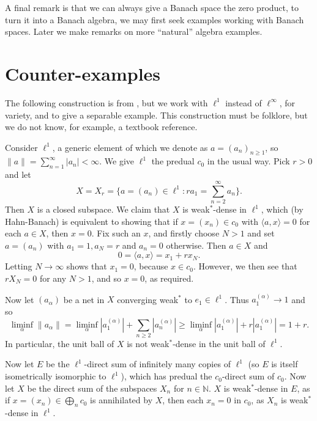 \documentclass[a4paper,12pt]{article}
\theoremstyle{plain}
\theoremstyle{definition}
\newcommand{\ip}[2]{\langle{#1},{#2}\rangle}
\begin{document}
A final remark is that we can always give a Banach space the zero product, to turn it into a Banach
algebra, we may first seek examples working with Banach spaces.  Later we make remarks on more
``natural'' algebra examples.


\section{Counter-examples}

The following construction is from \cite{oz}, but we work with $\ell^1$ instead of $\ell^\infty$,
for variety, and to give a separable example.  This construction must be folklore, but we do not
know, for example, a textbook reference.

Consider $\ell^1$, a generic element of which we denote as $a = (a_n)_{n\geq 1}$, so $\|a\| =
\sum_{n=1}^\infty |a_n| < \infty$.  We give $\ell^1$ the predual $c_0$ in the usual way.  Pick
$r>0$ and let
\[ X = X_r = \big\{ a=(a_n)\in\ell^1 : r a_1 = \sum_{n=2}^\infty a_n \big\}. \]
Then $X$ is a closed subspace.
We claim that $X$ is weak$^*$-dense in $\ell^1$, which (by Hahn-Banach) is equivalent to showing
that if $x=(x_n)\in c_0$ with $\ip{a}{x}=0$ for each $a\in X$, then $x=0$.  Fix such an $x$, and
firstly choose $N>1$ and set $a=(a_n)$ with $a_1=1, a_N=r$ and $a_n=0$ otherwise.  Then $a\in X$
and
\[ 0 = \ip{a}{x} = x_1 + rx_N. \]
Letting $N\rightarrow\infty$ shows that $x_1=0$, because $x\in c_0$.  However, we then see that
$rX_N=0$ for any $N>1$, and so $x=0$, as required.

Now let $(a_\alpha)$ be a net in $X$ converging weak$^*$ to $e_1\in\ell^1$.  Thus $a^{(\alpha)}_1
\rightarrow 1$ and so
\[ \liminf_\alpha \|a_\alpha\| = \liminf_\alpha |a^{(\alpha)}_1| + \sum_{n\geq 2} |a^{(\alpha)}_n|
\geq \liminf_\alpha |a^{(\alpha)}_1| + r |a^{(\alpha)}_1| = 1+r. \]
In particular, the unit ball of $X$ is not weak$^*$-dense in the unit ball of $\ell^1$.

Now let $E$ be the $\ell^1$-direct sum of infinitely many copies of $\ell^1$ (so $E$ is itself
isometrically isomorphic to $\ell^1$), which has predual the $c_0$-direct sum of $c_0$.  Now let
$X$ be the direct sum of the subspaces $X_n$ for $n\in\mathbb N$.  $X$ is weak$^*$-dense in $E$,
as if $x=(x_n)\in\bigoplus_n c_0$ is annihilated by $X$, then each $x_n=0$ in $c_0$, as $X_n$ is
weak$^*$-dense in $\ell^1$.
\end{document}
